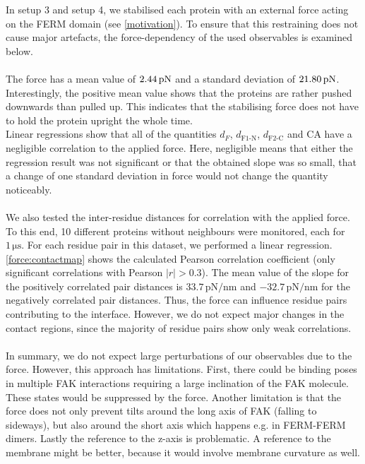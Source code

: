 \label{forceana}
In setup 3 and setup 4, we stabilised each protein with an external force acting on the FERM domain (see \autoref{motivation}). To ensure that this restraining does not cause major artefacts, the force-dependency of the used observables is examined below.\\
\\
The force has a mean value of $2.44\,\forceunit$ and a standard deviation of $21.80\,\forceunit$. Interestingly, the positive mean value shows that the proteins are rather pushed downwards than pulled up. This indicates that the stabilising force does not have to hold the protein upright the whole time. %
\\
Linear regressions show that all of the quantities $d_F$, $d_\text{F1-N}$, $d_\text{F2-C}$ and CA have a negligible correlation to the applied force. Here, negligible means that either the regression result was not significant or that the obtained slope was so small, that a change of one standard deviation in force would not change the quantity noticeably.\\
\\
We also tested the inter-residue distances for correlation with the applied force. To this end, 10 different proteins without neighbours were monitored, each for $1\,\si{\micro\second}$. For each residue pair in this dataset, we performed a linear regression. \autoref{force:contactmap} shows the calculated Pearson correlation coefficient (only significant correlations with Pearson $\left|r\right| > 0.3$). The mean value of the slope for the positively correlated pair distances is $33.7\,\si{\pico\newton/\nano\metre}$ and $-32.7\,\si{\pico\newton/\nano\metre}$ for the negatively correlated pair distances. Thus, the force can influence residue pairs contributing to the interface. However, we do not expect major changes in the contact regions, since the majority of residue pairs show only weak correlations.\\
\\
In summary, we do not expect large perturbations of our observables due to the force. However, this approach has limitations. First, there could be binding poses in multiple FAK interactions requiring a large inclination of the FAK molecule. These states would be suppressed by the force. Another limitation is that the force does not only prevent tilts around the long axis of FAK (falling to sideways), but also around the short axis which happens e.g. in FERM-FERM dimers. Lastly the reference to the z-axis is problematic. A reference to the membrane might be better, because it would involve membrane curvature as well.

